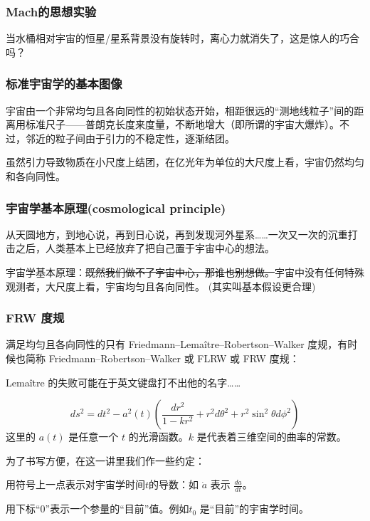 \documentclass[CJK,13pt]{beamer}
\date{}
\begin{document}
  \bch

  \begin{frame}
    \frametitle{Mach的思想实验}


    当水桶相对宇宙的恒星/星系背景没有旋转时，离心力就消失了，这是惊人的巧合吗？
  \end{frame}


  \begin{frame}
    \frametitle{标准宇宙学的基本图像}
    宇宙由一个非常均匀且各向同性的初始状态开始，相距很远的“测地线粒子”间的距离用标准尺子——普朗克长度来度量，不断地增大（即所谓的宇宙大爆炸）。不过，邻近的粒子间由于引力的不稳定性，逐渐结团。
    \emini
    \emini

    \skiplines

    虽然引力导致物质在小尺度上结团，在亿光年为单位的大尺度上看，宇宙仍然均匀和各向同性。    

  \end{frame}

\begin{frame}
  \frametitle{宇宙学基本原理(cosmological principle)}
  从天圆地方，到地心说，再到日心说，再到发现河外星系……一次又一次的沉重打击之后，人类基本上已经放弃了把自己置于宇宙中心的想法。

  

  
  \skipline
  
  宇宙学基本原理：\sout{既然我们做不了宇宙中心，那谁也别想做。}{\blue 宇宙中没有任何特殊观测者，大尺度上看，宇宙均匀且各向同性。}
  {\scriptsize (其实叫基本假设更合理)}
\end{frame}
  

\begin{frame}
  \frametitle{FRW 度规}
  满足均匀且各向同性的只有 Friedmann–Lema\^itre–Robertson–Walker 度规，有时候也简称 Friedmann–Robertson–Walker 或 FLRW 或 FRW 度规：

  {\scriptsize Lema\^itre 的失败可能在于英文键盘打不出他的名字……}
  
  $$ ds^2 = dt^2 - a^2(t)\left(\frac{dr^2}{1-kr^2}+r^2d\theta^2+r^2\sin^2\theta d\phi^2\right)$$
  这里的 $a(t)$ 是任意一个 $t$ 的光滑函数。$k$ 是代表着三维空间的曲率的常数。

  \skipline
  
  为了书写方便，在这一讲里我们作一些约定：
  \bitem
\item{用符号上一点表示对宇宙学时间$t$的导数：如 $\dot{a}$ 表示 $\frac{da}{dt}$。}
\item{用下标``0''表示一个参量的“目前”值。例如$t_0$ 是“目前”的宇宙学时间。}
  \eitem
\end{frame}
\end{document}
